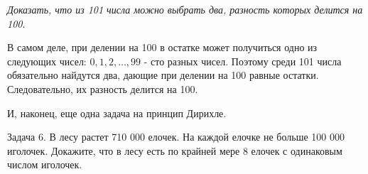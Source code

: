 \documentclass[main.tex]{subfiles}
\begin{document}
\begin{multicols}{2}
 \textit{Доказать, что из 101 числа можно выбрать два, разность которых делится на 100}.
 
 В самом деле, при делении на 100 в остатке может получиться одно из следующих чисел: $0, 1, 2, \dots, 99$ - сто разных чисел. Поэтому среди 101 числа обязательно найдутся два, дающие при делении на 100 равные остатки. Следовательно, их разность делится на 100.
 
 И, наконец, еще одна задача на принцип Дирихле.
 
{\footnotesize Задача 6. В лесу растет 710 000 елочек. На каждой елочке не больше 100 000 иголочек. Докажите, что в лесу есть по крайней мере 8 елочек с одинаковым числом иголочек. \par}
\end{multicols}
\end{document}
